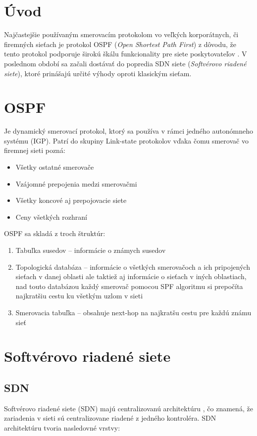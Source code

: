 \documentclass[conference]{IEEEtran}
\begin{document}
\section{Úvod}

Najčastejšie používaným smerovacím protokolom vo veľkých korporátnych, či firemných sieťach je protokol OSPF (\textit{Open Shortest Path First}) z dôvodu, že tento protokol podporuje širokú škálu funkcionality pre siete poskytovateľov \cite{first}. V poslednom období sa začali dostávať do popredia SDN siete (\textit{Softvérovo riadené siete}), ktoré prinášajú určité výhody oproti klasickým sieťam.

\section{OSPF}

Je dynamický smerovací protokol, ktorý sa používa v rámci jedného autonómneho systému (IGP). Patrí do skupiny Link-state protokolov vďaka čomu smerovač vo firemnej sieti pozná:

\begin{itemize}
	\item{Všetky ostatné smerovače}
	\item{Vzájomné prepojenia medzi smerovačmi}
	\item{Všetky koncové aj prepojovacie siete}
	\item{Ceny všetkých rozhraní}
\end{itemize}

OSPF sa skladá z troch štruktúr:

\begin{enumerate}
\item{Tabuľka susedov – informácie o známych susedov}
\item{Topologická databáza – informácie o všetkých smerovačoch a ich pripojených sieťach v danej oblasti ale taktiež aj informácie o sieťach v iných oblastiach, nad touto databázou každý smerovač pomocou SPF algoritmu si prepočíta najkratšiu cestu ku všetkým uzlom v sieti}
\item{Smerovacia tabuľka – obsahuje next-hop na najkratšu cestu pre každú známu sieť}\cite{ospf}
\end{enumerate}

\section{Softvérovo riadené siete}

\subsection{SDN}
Softvérovo riadené siete (SDN) majú centralizovanú architektúru \cite{second}, čo znamená, že zariadenia v sieti sú centralizovane riadené z jedného kontroléra. SDN architektúru tvoria nasledovné vrstvy:
\end{document}
